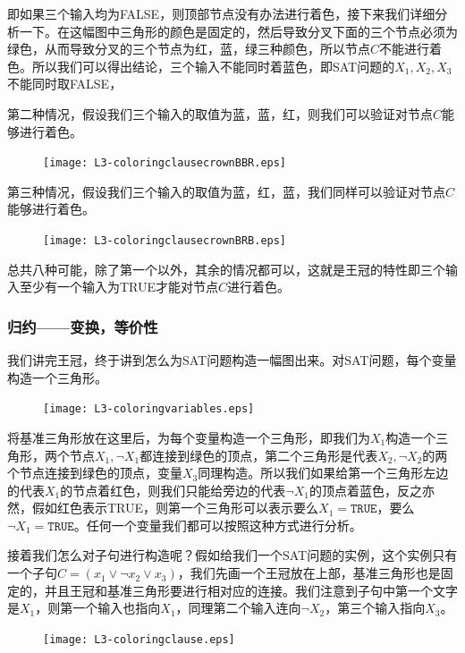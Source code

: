 即如果三个输入均为FALSE，则顶部节点没有办法进行着色，接下来我们详细分析一下。在这幅图中三角形的颜色是固定的，然后导致分叉下面的三个节点必须为绿色，从而导致分叉的三个节点为红，蓝，绿三种颜色，所以节点$C$不能进行着色。所以我们可以得出结论，三个输入不能同时着蓝色，即SAT问题的$X_1,X_2,X_3$不能同时取FALSE，

第二种情况，假设我们三个输入的取值为蓝，蓝，红，则我们可以验证对节点$C$能够进行着色。

\begin{figure}[H]
\centering
 \texttt{[image: L3-coloringclausecrownBBR.eps]}
\end{figure}

第三种情况，假设我们三个输入的取值为蓝，红，蓝，我们同样可以验证对节点$C$能够进行着色。

\begin{figure}[H]
\centering
 \texttt{[image: L3-coloringclausecrownBRB.eps]}
\end{figure}

总共八种可能，除了第一个以外，其余的情况都可以，这就是王冠的特性即三个输入至少有一个输入为TRUE才能对节点$C$进行着色。

\subsubsection{归约——变换，等价性}
我们讲完王冠，终于讲到怎么为SAT问题构造一幅图出来。对SAT问题，每个变量构造一个三角形。

\begin{figure}[H]
\centering
 \texttt{[image: L3-coloringvariables.eps]}
\end{figure}

将基准三角形放在这里后，为每个变量构造一个三角形，即我们为$X_1$构造一个三角形，两个节点$X_1,\neg X_1$都连接到绿色的顶点，第二个三角形是代表$X_2,\neg X_2$的两个节点连接到绿色的顶点，变量$X_3$同理构造。所以我们如果给第一个三角形左边的代表$X_1$的节点着红色，则我们只能给旁边的代表$\neg X_1$的顶点着蓝色，反之亦然，假如红色表示TRUE，则第一个三角形可以表示要么$X_1=\texttt{TRUE}$，要么$\neg X_1 = \texttt{TRUE}$。任何一个变量我们都可以按照这种方式进行分析。

接着我们怎么对子句进行构造呢？假如给我们一个SAT问题的实例，这个实例只有一个子句$C = (x_1 \vee \neg x_2 \vee x_3)$，我们先画一个王冠放在上部，基准三角形也是固定的，并且王冠和基准三角形要进行相对应的连接。我们注意到子句中第一个文字是$X_1$，则第一个输入也指向$X_1$，同理第二个输入连向$\neg X_2$，第三个输入指向$X_3$。

\begin{figure}[H]
\centering
 \texttt{[image: L3-coloringclause.eps]}
\end{figure}


